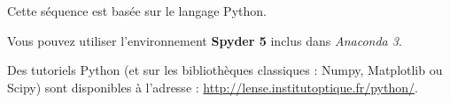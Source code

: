 Cette séquence est basée sur le langage Python.

Vous pouvez utiliser %
l'environnement \textbf{Spyder 5} inclus dans \textit{Anaconda 3}.

Des tutoriels Python (et sur les bibliothèques classiques : Numpy, Matplotlib ou Scipy) sont disponibles à l'adresse : \href{http://lense.institutoptique.fr/python/}{http://lense.institutoptique.fr/python/}. 
